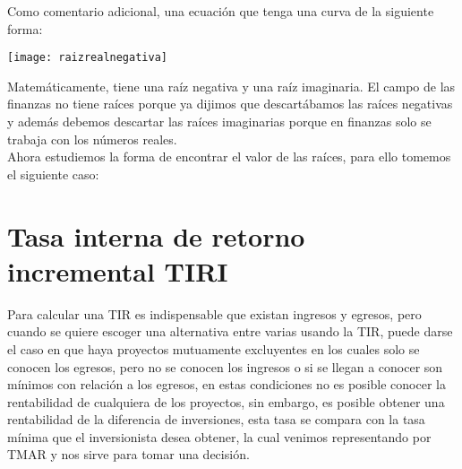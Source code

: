 Como comentario adicional, una ecuación que tenga una curva de la siguiente forma: \

\begin{center}
	\texttt{[image: raizrealnegativa]}
\end{center}

Matemáticamente, tiene una raíz negativa y una raíz imaginaria. El campo de las finanzas no tiene raíces porque ya dijimos que descartábamos las raíces negativas y además debemos descartar las raíces imaginarias porque en finanzas solo se trabaja con los números reales.\\

Ahora estudiemos la forma de encontrar el valor de las raíces, para ello tomemos el siguiente caso:




\section{Tasa interna de retorno incremental TIRI}

Para calcular una TIR es indispensable que existan ingresos y egresos, pero cuando se quiere escoger una alternativa entre varias usando la TIR, puede darse el caso en que haya proyectos mutuamente excluyentes en los cuales solo se conocen los egresos, pero no se conocen los ingresos o si se llegan a conocer son mínimos con relación a los egresos, en estas condiciones no es posible conocer la rentabilidad de cualquiera de los proyectos, sin embargo, es posible obtener una rentabilidad de la diferencia de inversiones, esta tasa se compara con la tasa mínima que el inversionista desea obtener, la cual venimos representando por TMAR y nos sirve para tomar una decisión. \






